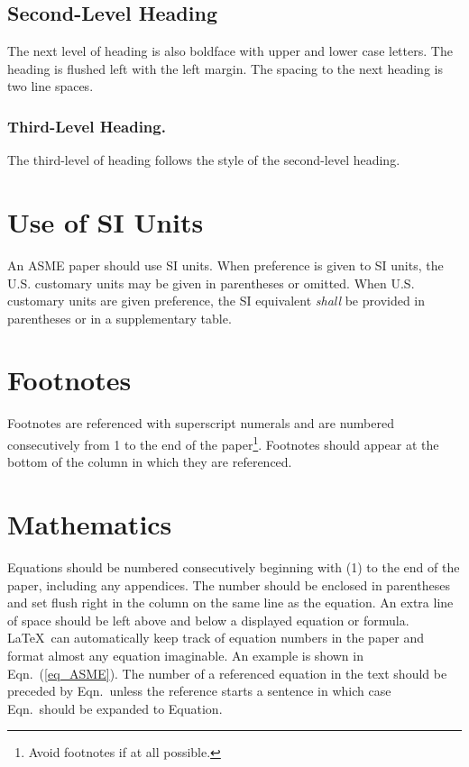 \documentclass[twocolumn,10pt]{asme2ej}
\begin{document}
\subsection{Second-Level Heading}

The next level of heading is also boldface with upper and lower case letters. 
The heading is flushed left with the left margin. The spacing to the next heading is two line spaces.

\subsubsection{Third-Level Heading.}

The third-level of heading follows the style of the second-level heading.


\section{Use of SI Units}

An ASME paper should use SI units.  When preference is given to SI units, the U.S. customary units may be given in parentheses or omitted. When U.S. customary units are given preference, the SI equivalent {\em shall} be provided in parentheses or in a supplementary table. 

\section{Footnotes\protect\footnotemark}

Footnotes are referenced with superscript numerals and are numbered consecutively from 1 to the end of the paper\footnote{Avoid footnotes if at all possible.}. Footnotes should appear at the bottom of the column in which they are referenced.


\section{Mathematics}

Equations should be numbered consecutively beginning with (1) to the end of the paper, including any appendices.  The number should be enclosed in parentheses and set flush right in the column on the same line as the equation.  An extra line of space should be left above and below a displayed equation or formula. \LaTeX\ can automatically keep track of equation numbers in the paper and format almost any equation imaginable. An example is shown in Eqn.~(\ref{eq_ASME}). The number of a referenced equation in the text should be preceded by Eqn.\ unless the reference starts a sentence in which case Eqn.\ should be expanded to Equation.
\end{document}
